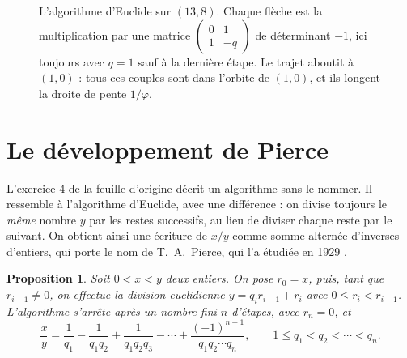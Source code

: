 \documentclass[11pt,a4paper]{article}
\theoremstyle{plain}
\newtheorem{proposition}[theoreme]{Proposition}
\theoremstyle{definition}
\theoremstyle{remark}
\begin{document}
\begin{figure}[h]
\centering
{}
\caption{L'algorithme d'Euclide sur $(13,8)$. Chaque flèche est la multiplication par une matrice $\begin{pmatrix}0&1\\1&-q\end{pmatrix}$ de déterminant $-1$, ici toujours avec $q=1$ sauf à la dernière étape. Le trajet aboutit à $(1,0)$ : tous ces couples sont dans l'orbite de $(1,0)$, et ils longent la droite de pente $1/\varphi$.}\label{fig:euclide}
\end{figure}

\section{Le développement de Pierce}

L'exercice 4 de la feuille d'origine décrit un algorithme sans le nommer. Il ressemble à l'algorithme d'Euclide, avec une différence : on divise toujours le \emph{même} nombre $y$ par les restes successifs, au lieu de diviser chaque reste par le suivant. On obtient ainsi une écriture de $x/y$ comme somme alternée d'inverses d'entiers, qui porte le nom de T.~A.~Pierce, qui l'a étudiée en 1929 \cite{pierce}.

\begin{proposition}\label{prop:pierce}
Soit $0<x<y$ deux entiers. On pose $r_0=x$, puis, tant que $r_{i-1}\neq0$, on effectue la division euclidienne $y=q_ir_{i-1}+r_i$ avec $0\leq r_i<r_{i-1}$. L'algorithme s'arrête après un nombre fini $n$ d'étapes, avec $r_n = 0$, et
\[
  \frac{x}{y}=\frac1{q_1}-\frac1{q_1q_2}+\frac1{q_1q_2q_3}-\cdots+\frac{(-1)^{n+1}}{q_1q_2\cdots q_n},
  \qquad 1\leq q_1<q_2<\cdots<q_n .
\]
\end{proposition}
\end{document}
